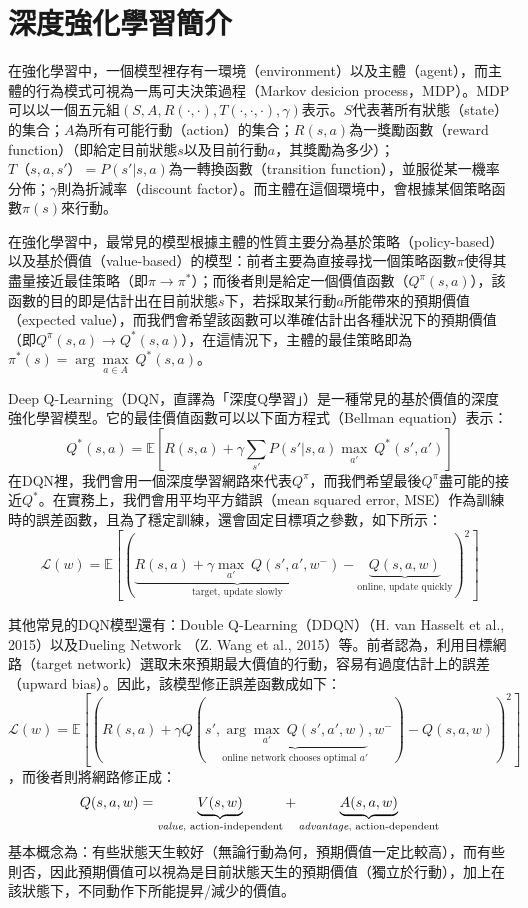 \documentclass{article}
\begin{document}
\section{深度強化學習簡介}
在強化學習中，一個模型裡存有一環境（environment）以及主體（agent），而主體的行為模式可視為一馬可夫決策過程（Markov desicion process，MDP）。MDP可以以一個五元組$(S,A,R(\cdot,\cdot),T(\cdot, \cdot, \cdot),\gamma)$表示。$S$代表著所有狀態（state）的集合；$A$為所有可能行動（action）的集合；$R(s,a)$為一獎勵函數（reward function）（即給定目前狀態$s$以及目前行動$a$，其獎勵為多少）；$T（s,a,s'）=P(s'|s,a)$為一轉換函數（transition function），並服從某一機率分佈；$\gamma$則為折減率（discount factor）。而主體在這個環境中，會根據某個策略函數$\pi(s)$來行動。\par
在強化學習中，最常見的模型根據主體的性質主要分為基於策略（policy-based）以及基於價值（value-based）的模型：前者主要為直接尋找一個策略函數$\pi$使得其盡量接近最佳策略（即$\pi \rightarrow \pi^*$）；而後者則是給定一個價值函數（$Q^\pi (s,a)$），該函數的目的即是估計出在目前狀態$s$下，若採取某行動$a$所能帶來的預期價值（expected value），而我們會希望該函數可以準確估計出各種狀況下的預期價值（即$Q^\pi (s,a) \rightarrow Q^* (s,a)$），在這情況下，主體的最佳策略即為$\pi^*(s) = \arg \underset{a \in A}\max\ Q^*(s,a)$。\par
Deep Q-Learning（DQN，直譯為「深度Q學習」）是一種常見的基於價值的深度強化學習模型。它的最佳價值函數可以以下面方程式（Bellman equation）表示：
\[Q^*(s,a) = \mathbb{E}\left[R(s,a) + \gamma \sum_{s'}P(s'|s,a) \underset{a'}\max\ Q^*(s',a')\right]\]
在DQN裡，我們會用一個深度學習網路來代表$Q^\pi$，而我們希望最後$Q^\pi$盡可能的接近$Q^*$。在實務上，我們會用平均平方錯誤（mean squared error, MSE）作為訓練時的誤差函數，且為了穩定訓練，還會固定目標項之參數，如下所示：
\[\mathcal{L}(w) = \mathbb{E}\left[\left(\underbrace{R(s,a) + \gamma \underset{a'}\max\ Q(s',a', w^-)}_{\text{target, update slowly}} - \underbrace{Q(s,a,w)}_{\text{online, update quickly}}\right)^2\right]\]
\par
其他常見的DQN模型還有：Double Q-Learning（DDQN）（H. van Hasselt et al., 2015）\cite{DBLP:journals/corr/HasseltGS15}以及Dueling Network （Z. Wang et al., 2015）\cite{DBLP:journals/corr/WangFL15}等。前者認為，利用目標網路（target network）選取未來預期最大價值的行動，容易有過度估計上的誤差（upward bias）。因此，該模型修正誤差函數成如下：
\[\mathcal{L}(w) = \mathbb{E}\left[\left(R(s,a) + \gamma Q(s',\underbrace{\arg \underset{a'}\max\ Q(s',a',w)}_{\text{online network chooses optimal } a'}, w^-) - Q(s,a,w)\right)^2\right]\]，而後者則將網路修正成：
\[Q(s,a,w) = \underbrace{V(s,w)}_{\text{\emph{value}, action-independent}} + \underbrace{A(s,a,w)}_{\text{\emph{advantage}, action-dependent}}\]
基本概念為：有些狀態天生較好（無論行動為何，預期價值一定比較高），而有些則否，因此預期價值可以視為是目前狀態天生的預期價值（獨立於行動），加上在該狀態下，不同動作下所能提昇/減少的價值。
\end{document}
